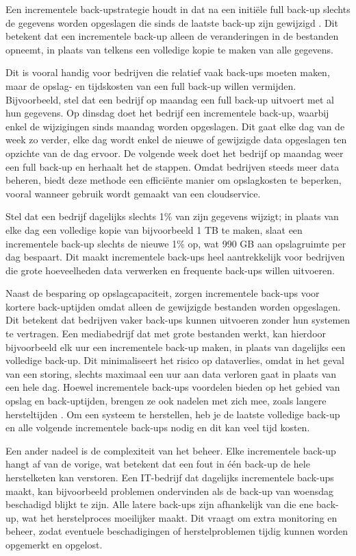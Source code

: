 Een incrementele back-upstrategie houdt in dat na een initiële full back-up slechts de gegevens worden opgeslagen die sinds de laatste back-up zijn gewijzigd \autocite{Zhao2024}. Dit betekent dat een incrementele back-up alleen de veranderingen in de bestanden opneemt, in plaats van telkens een volledige kopie te maken van alle gegevens. 

Dit is vooral handig voor bedrijven die relatief vaak back-ups moeten maken, maar de opslag- en tijdskosten van een full back-up willen vermijden. Bijvoorbeeld, stel dat een bedrijf op maandag een full back-up uitvoert met al hun gegevens. Op dinsdag doet het bedrijf een incrementele back-up, waarbij enkel de wijzigingen sinds maandag worden opgeslagen. Dit gaat elke dag van de week zo verder, elke dag wordt enkel de nieuwe of gewijzigde data opgeslagen ten opzichte van de dag ervoor. De volgende week doet het bedrijf op maandag weer een full back-up en herhaalt het de stappen. Omdat bedrijven steeds meer data beheren, biedt deze methode een efficiënte manier om opslagkosten te beperken, vooral wanneer gebruik wordt gemaakt van een cloudservice. 

Stel dat een bedrijf dagelijks slechts 1\% van zijn gegevens wijzigt; in plaats van elke dag een volledige kopie van bijvoorbeeld 1 TB te maken, slaat een incrementele back-up slechts de nieuwe 1\% op, wat 990 GB aan opslagruimte per dag bespaart. Dit maakt incrementele back-ups heel aantrekkelijk voor bedrijven die grote hoeveelheden data verwerken en frequente back-ups willen uitvoeren. 

Naast de besparing op opslagcapaciteit, zorgen incrementele back-ups voor kortere back-uptijden omdat alleen de gewijzigde bestanden worden opgeslagen. Dit betekent dat bedrijven vaker back-ups kunnen uitvoeren zonder hun systemen te vertragen. Een mediabedrijf dat met grote bestanden werkt, kan hierdoor bijvoorbeeld elk uur een incrementele back-up maken, in plaats van dagelijks een volledige back-up. Dit minimaliseert het risico op dataverlies, omdat in het geval van een storing, slechts maximaal een uur aan data verloren gaat in plaats van een hele dag. Hoewel incrementele back-ups voordelen bieden op het gebied van opslag en back-uptijden, brengen ze ook nadelen met zich mee, zoals langere hersteltijden \autocite{Chervenak1998}. Om een systeem te herstellen, heb je de laatste volledige back-up en alle volgende incrementele back-ups nodig en dit kan veel tijd kosten. 

Een ander nadeel is de complexiteit van het beheer. Elke incrementele back-up hangt af van de vorige, wat betekent dat een fout in één back-up de hele herstelketen kan verstoren. Een IT-bedrijf dat dagelijks incrementele back-ups maakt, kan bijvoorbeeld problemen ondervinden als de back-up van woensdag beschadigd blijkt te zijn. Alle latere back-ups zijn afhankelijk van die ene back-up, wat het herstelproces moeilijker maakt. Dit vraagt om extra monitoring en beheer, zodat eventuele beschadigingen of herstelproblemen tijdig kunnen worden opgemerkt en opgelost.

